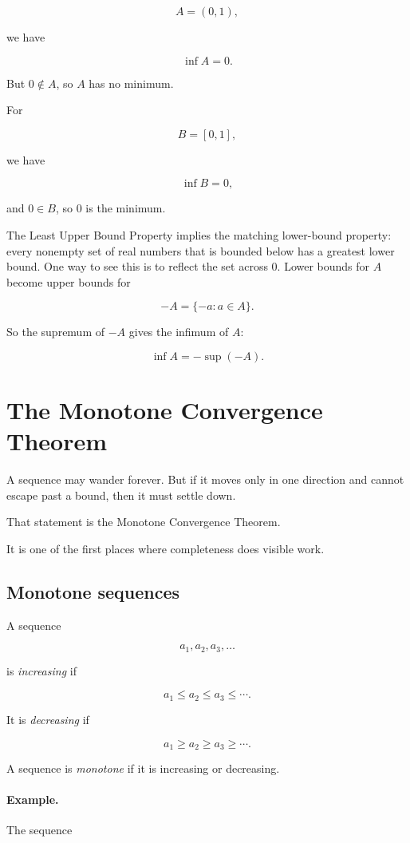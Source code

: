 \[
A=(0,1),
\]

we have

\[
\inf A=0.
\]

But \(0\notin A\), so \(A\) has no minimum.

For

\[
B=[0,1],
\]

we have

\[
\inf B=0,
\]

and \(0\in B\), so \(0\) is the minimum.

The Least Upper Bound Property implies the matching lower-bound property: every
nonempty set of real numbers that is bounded below has a greatest lower bound.  One
way to see this is to reflect the set across \(0\).  Lower bounds for \(A\) become upper
bounds for

\[
-A=\{-a:a\in A\}.
\]

So the supremum of \(-A\) gives the infimum of \(A\):

\[
\boxed{
\inf A=-\sup(-A).
}
\]

\section{The Monotone Convergence Theorem}
\label{appsec:monotone-convergence-theorem}

A sequence may wander forever.  But if it moves only in one direction and cannot escape
past a bound, then it must settle down.

That statement is the Monotone Convergence Theorem.

It is one of the first places where completeness does visible work.

\subsection{Monotone sequences}
\label{appsubsec:monotone-sequences}

A sequence

\[
a_1,a_2,a_3,\ldots
\]

is \emph{increasing} if

\[
a_1\le a_2\le a_3\le\cdots.
\]

It is \emph{decreasing} if

\[
a_1\ge a_2\ge a_3\ge\cdots.
\]

A sequence is \emph{monotone} if it is increasing or decreasing.

\paragraph{Example.}
The sequence

